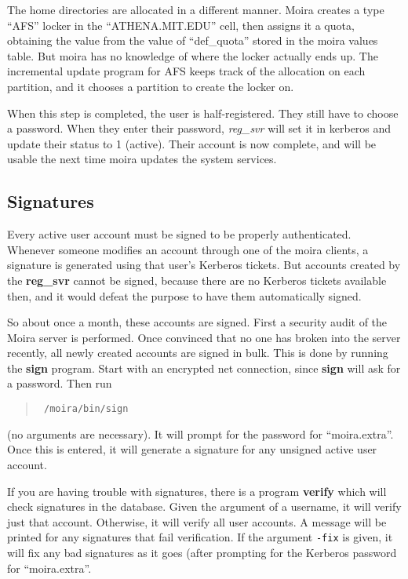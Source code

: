 The home directories are allocated in a different manner.  Moira
creates a type ``AFS'' locker in the ``ATHENA.MIT.EDU'' cell, then
assigns it a quota, obtaining the value from the value of
``def\_quota'' stored in the moira values table.  But moira has no
knowledge of where the locker actually ends up.  The incremental
update program for AFS keeps track of the allocation on each
partition, and it chooses a partition to create the locker on.

When this step is completed, the user is half-registered.  They still
have to choose a password.  When they enter their password, {\em
reg\_svr} will set it in kerberos and update their status to 1
(active).  Their account is now complete, and will be usable the next
time moira updates the system services.

\subsection{Signatures}

Every active user account must be signed to be properly authenticated.
Whenever someone modifies an account through one of the moira clients,
a signature is generated using that user's Kerberos tickets.  But
accounts created by the {\bf reg\_svr} cannot be signed, because there
are no Kerberos tickets available then, and it would defeat the
purpose to have them automatically signed.

So about once a month, these accounts are signed.  First a security
audit of the Moira server is performed.  Once convinced that no one
has broken into the server recently, all newly created accounts are
signed in bulk.  This is done by running the {\bf sign} program.
Start with an encrypted net connection, since {\bf sign} will ask for
a password.  Then run
\begin{quotation}\tt
/moira/bin/sign
\end{quotation}
(no arguments are necessary).  It will prompt for the password for
``moira.extra''.  Once this is entered, it will generate a signature
for any unsigned active user account.

If you are having trouble with signatures, there is a program {\bf
verify} which will check signatures in the database.  Given the
argument of a username, it will verify just that account.  Otherwise,
it will verify all user accounts.  A message will be printed for any
signatures that fail verification.  If the argument {\tt -fix} is
given, it will fix any bad signatures as it goes (after prompting for
the Kerberos password for ``moira.extra''.

